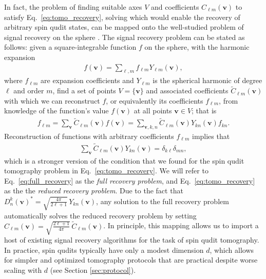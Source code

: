\documentclass[notitlepage,twocolumn]{revtex4-2}
\newcommand{\p}[1]{\left(#1\right)} %
\renewcommand{\v}{\bm} %
\renewcommand{\set}[1]{\{#1\}} %
\begin{document}
In fact, the problem of finding suitable axes $V$ and coefficients $C_{\ell m}\p{\v v}$ to satisfy Eq.~\eqref{eq:tomo_recovery}, solving which would enable the recovery of arbitrary spin qudit states, can be mapped onto the well-studied problem of signal recovery on the sphere \cite{mcewen2011novel, rauhut2011sparse, alem2012sparse, khalid2014optimaldimensionality}.
The signal recovery problem can be stated as follows: given a square-integrable function $f$ on the sphere, with the harmonic expansion
\begin{align}
  f\p{\v v} = \sum_{\ell,m} f_{\ell m} Y_{\ell m}\p{\v v},
\end{align}
where $f_{\ell m}$ are expansion coefficients and $Y_{\ell m}$ is the spherical harmonic of degree $\ell$ and order $m$, find a set of points $V=\set{\v v}$ and associated coefficients $\tilde C_{\ell m}\p{\v v}$ with which we can reconstruct $f$, or equivalently its coefficients $f_{\ell m}$, from knowledge of the function's value $f\p{\v v}$ at all points $\v v\in V$; that is
\begin{align}
  f_{\ell m} = \sum_{\v v} \tilde C_{\ell m}\p{\v v} f\p{\v v}
  = \sum_{\v v,k,n} \tilde C_{\ell m}\p{\v v} Y_{kn}\p{\v v} f_{kn}.
\end{align}
Reconstruction of functions with arbitrary coefficients $f_{\ell m}$ implies that
\begin{align}
  \sum_{\v v} \tilde C_{\ell m}\p{\v v} Y_{kn}\p{\v v}
  = \delta_{k\ell} \delta_{mn},
  \label{eq:full_recovery}
\end{align}
which is a stronger version of the condition that we found for the spin qudit tomography problem in Eq.~\eqref{eq:tomo_recovery}.
We will refer to Eq.~\eqref{eq:full_recovery} as the {\it full recovery problem}, and Eq.~\eqref{eq:tomo_recovery} as the the {\it reduced recovery problem}.
Due to the fact that $D^k_n\p{\v v}^* = \sqrt{\frac{4\pi}{2\ell+1}}\, Y_{kn}\p{\v v}$, any solution to the full recovery problem automatically solves the reduced recovery problem by setting $C_{\ell m}\p{\v v} = \sqrt{\frac{2\ell+1}{4\pi}}\, \tilde C_{\ell m}\p{\v v}$.
In principle, this mapping allows us to import a host of existing signal recovery algorithms \cite{mcewen2011novel, rauhut2011sparse, alem2012sparse, khalid2014optimaldimensionality} for the task of spin qudit tomography.
In practice, spin qudits typically have only a modest dimension $d$, which allows for simpler and optimized tomography protocols that are practical despite worse scaling with $d$ (see Section \ref{sec:protocol}).
\end{document}
